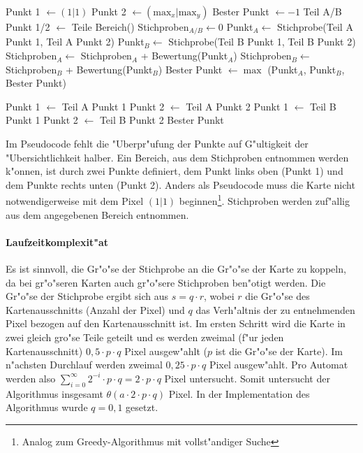 \begin{algorithmic}
\STATE Punkt 1 $\gets (1|1)$
\STATE Punkt 2 $\gets (\mbox{max}_x|\mbox{max}_y)$
\STATE Bester Punkt $\gets -1$
	\STATE Teil A/B Punkt 1/2 $\gets$ Teile Bereich()
	\STATE Stichproben$_{A/B} \gets 0$
		\STATE Punkt$_A \gets$ Stichprobe(Teil A Punkt 1, Teil A Punkt 2)
		\STATE Punkt$_B \gets$ Stichprobe(Teil B Punkt 1, Teil B Punkt 2)
		\STATE Stichproben$_A \gets$ Stichproben$_A$ + Bewertung(Punkt$_A$)
		\STATE Stichproben$_B \gets$ Stichproben$_B$ + Bewertung(Punkt$_B$)
		\STATE Bester Punkt $\gets \max$ (Punkt$_A$, Punkt$_B$, Bester Punkt)
	\ENDFOR
	
		\STATE Punkt 1 $\gets$ Teil A Punkt 1
		\STATE Punkt 2 $\gets$ Teil A Punkt 2
	\ELSE
		\STATE Punkt 1 $\gets$ Teil B Punkt 1
		\STATE Punkt 2 $\gets$ Teil B Punkt 2
	\ENDIF
\ENDWHILE
\RETURN Bester Punkt
\end{algorithmic}
Im Pseudocode fehlt die "Uberpr"ufung der Punkte auf G"ultigkeit der "Ubersichtlichkeit halber. Ein Bereich, aus dem Stichproben entnommen werden k"onnen, ist durch zwei Punkte definiert, dem Punkt links oben (Punkt 1) und dem Punkte rechts unten (Punkt 2). Anders als Pseudocode muss die Karte nicht notwendigerweise mit dem Pixel \((1|1)\) beginnen\footnote{Analog zum Greedy-Algorithmus mit vollst"andiger Suche}. Stichproben werden zuf"allig aus dem angegebenen Bereich entnommen.

\paragraph{Laufzeitkomplexit"at}
Es ist sinnvoll, die Gr"o"se der Stichprobe an die Gr"o"se der Karte zu koppeln, da bei gr"o"seren Karten auch gr"o"sere Stichproben ben"otigt werden. Die Gr"o"se der Stichprobe ergibt sich aus \(s = q \cdot r\), wobei \(r\) die Gr"o"se des Kartenausschnitts (Anzahl der Pixel) und \(q\) das Verh"altnis der zu entnehmenden Pixel bezogen auf den Kartenausschnitt ist. Im ersten Schritt wird die Karte in zwei gleich gro"se Teile geteilt und es werden zweimal (f"ur jeden Kartenausschnitt) \(0,5 \cdot p \cdot q\) Pixel ausgew"ahlt (\(p\) ist die Gr"o"se der Karte). Im n"achsten Durchlauf werden zweimal \(0,25 \cdot p \cdot q\) Pixel ausgew"ahlt. Pro Automat werden also \(\sum_{i=0}^{\infty} 2^{-i} \cdot p \cdot q = 2 \cdot p \cdot q\) Pixel untersucht. Somit untersucht der Algorithmus insgesamt \(\theta(a \cdot 2 \cdot p \cdot q)\) Pixel. In der Implementation des Algorithmus wurde \(q = 0,1\) gesetzt. 

